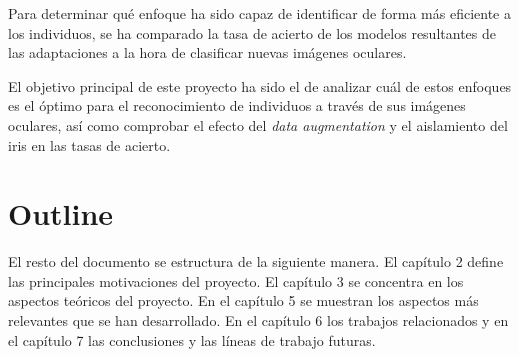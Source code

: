 Para determinar qué enfoque ha sido capaz de identificar de forma más eficiente a los individuos, se ha comparado la tasa de acierto de los modelos resultantes de las adaptaciones a la hora de clasificar nuevas imágenes oculares. 

El objetivo principal de este proyecto ha sido el de analizar cuál de estos enfoques es el óptimo para el reconocimiento de individuos a través de sus imágenes oculares, así como comprobar el efecto del \textit{data augmentation } y el aislamiento del iris en las tasas de acierto.

\section{Outline}

El resto del documento se estructura de la siguiente manera. El capítulo 2  define las principales motivaciones del proyecto. El capítulo 3  se concentra en los aspectos teóricos del proyecto. En el capítulo 5  se muestran los aspectos
más relevantes que se han desarrollado. En el capítulo 6  los trabajos relacionados y en el capítulo 7  las conclusiones y las líneas de trabajo futuras.
